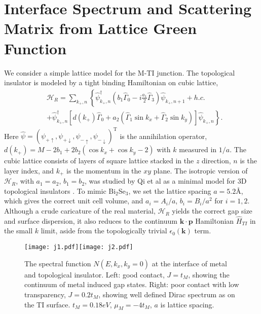 \documentclass[11pt,revtex,aps]{report}
\def\v#1{\mathbf{#1}}
\newcommand{\kp}{k_{+}}
\begin{document}
\section{Interface Spectrum and Scattering Matrix from Lattice Green Function} 

We consider a simple lattice model for the M-TI junction.
The topological insulator is modeled by 
a tight binding Hamiltonian on cubic lattice,
\begin{eqnarray*}
&\mathscr{H}_R=\sum_{\kp,n}\left\{ 
\hat{\psi}_{\kp,n}^\dagger (b_1\hat{\Gamma}_0-i\frac{a_1}{2}\hat{\Gamma}_3)  \hat{\psi}_{\kp,n+1}+ h.c. \right. \\
&+\left. 
\hat{\psi}_{\kp,n}^\dagger\left[d(\kp)\hat{\Gamma}_0+a_2(\hat{\Gamma}_1\sin k_x +\hat{\Gamma}_2\sin k_y)\right] \hat{\psi}_{\kp,n} \right\} .
\end{eqnarray*}
Here $\hat{\psi}=(\psi_{+\uparrow},\psi_{+\downarrow},\psi_{-\uparrow},\psi_{-\downarrow})^\mathrm{T}$ is the annihilation operator, $d(\kp)=M-2b_1+2b_2(\cos k_x+\cos k_y-2)$ with $k$ measured in $1/a$. 
The cubic lattice consists of layers of square lattice stacked in the $z$ direction,
$n$ is the layer index, and $\kp$ is the momentum in the $xy$ plane.
The isotropic version of $\mathscr{H}_R$, with $a_1=a_2$, $b_1=b_2$, was 
studied by Qi et al as a minimal model for 3D topological insulators \cite{qi_field}.
To mimic Bi$_2$Se$_3$, we set the lattice spacing $a=5.2$\AA, which gives the correct unit cell volume, 
and $a_i=A_i/a$, $b_i=B_i/a^2$ for $i=1,2$. Although a crude caricature 
of the real material, $\mathscr{H}_R$ yields the correct gap size and surface dispersion, it also reduces to 
the continuum  $\mathbf{k\cdot p}$ Hamiltonian $\hat{H}_{TI}$ in the small $k$ limit, 
aside from the topologically trivial $\epsilon_0(\v{k})$ term.
 
\begin{figure}
\center
\texttt{[image: j1.pdf]}\texttt{[image: j2.pdf]}
\caption{The spectral function $N(E,k_x,k_y=0)$ at the interface of metal and topological insulator. Left: 
good contact, $J=t_M$, showing the continuum of metal induced gap states. 
Right: poor contact with low transparency, $J=0.2t_M$, showing well 
defined Dirac spectrum as on the TI surface. $t_M=0.18eV$, $\mu_M=-4t_M$, $a$ is lattice spacing.}
\end{figure}
 
\end{document}
